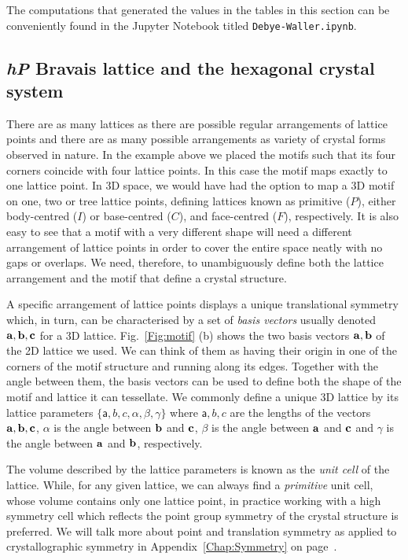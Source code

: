 The computations that generated the values in the tables in this section can be conveniently found in the Jupyter Notebook titled \texttt{Debye-Waller.ipynb}.






\subsection{ \textbf{\textit{hP}} Bravais lattice and the hexagonal crystal system}
     
\label{Sect:spaceLattice}
There are as many lattices as there are possible regular arrangements of lattice points and there are as many possible arrangements as variety of crystal forms observed in nature. In the example above we placed the motifs such that its four corners coincide with four lattice points. In this case the motif maps exactly to one lattice point. In 3D space, we would have had the option to map a 3D motif on one, two or tree lattice points, defining lattices known as primitive ($P$), either body-centred ($I$) or base-centred ($C$), and face-centred ($F$), respectively. It is also easy to see that a motif with a very different shape will need a different arrangement of lattice points in order to cover the entire space neatly with no gaps or overlaps. We need, therefore, to unambiguously define both the lattice arrangement and the motif that define a crystal structure.   

A specific arrangement of lattice points displays a unique translational symmetry which, in turn, can be characterised by a set of \textit{basis vectors} usually denoted $\vb{a}, \vb{b}, \vb{c}$ for a 3D lattice. Fig.~\ref{Fig:motif} (b) shows the two basis vectors $\vb{a}, \vb{b}$ of the 2D lattice we used. We can think of them as having their origin in one of the corners of the motif structure and running along its edges. Together with the angle between them, the basis vectors can be used to define both the shape of the motif and lattice it can tessellate. We commonly define a unique 3D lattice by its lattice parameters $\{\mathsf{a}, b, c, \alpha, \beta, \gamma\}$ where $\mathsf{a}, b, c$ are the lengths of the vectors $\vb{a}, \vb{b}, \vb{c}$, $\alpha$ is the angle between $\vb{b}$ and $\vb{c}$, $\beta$ is the angle between $\vb{a}$ and $\vb{c}$ and $\gamma$ is the angle between $\vb{a}$ and $\vb{b}$, respectively. 

The volume described by the lattice parameters is known as the \textit{unit cell} of the lattice. While, for any given lattice, we can always find a \textit{primitive} unit cell, whose volume contains only one lattice point, in practice working with a high symmetry cell which reflects the point group symmetry of the crystal structure is preferred. We will talk more about point and translation symmetry as applied to crystallographic symmetry in Appendix~\ref{Chap:Symmetry} on page~\pageref{Chap:Symmetry}.

